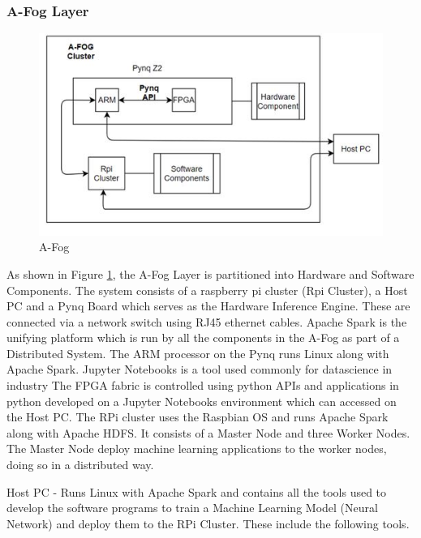 \subsubsection{A-Fog Layer}
    \begin{flushleft}
        \begin{figure}[H]
          
              \includegraphics[scale=0.8]{images/A-Fog.JPG}
              \caption{A-Fog}
              \label{fig:A-Fog}
        \end{figure}
        
        As shown in Figure \ref{fig:A-Fog}, the A-Fog Layer is partitioned into Hardware and Software Components. The system consists of a raspberry pi cluster (Rpi Cluster), a Host PC and a Pynq Board which serves as the Hardware Inference Engine. These are connected via a network switch using RJ45 ethernet cables. Apache Spark is the unifying platform which is run by all the components in the A-Fog as part of a Distributed System. The ARM processor on the Pynq runs Linux along with Apache Spark. Jupyter Notebooks is a tool used commonly for datascience in industry The FPGA fabric is controlled using python APIs and applications in python developed on a Jupyter Notebooks environment which can accessed on the Host PC. The RPi cluster uses the Raspbian OS and runs Apache Spark along with Apache HDFS. It consists of a Master Node and three Worker Nodes. The Master Node deploy machine learning applications to the worker nodes, doing so in a distributed way. 

        
        Host PC -  Runs Linux with Apache Spark and contains all the tools used to develop the software programs to train a Machine Learning Model (Neural Network) and deploy them to the RPi Cluster. These include the following tools.
         
        
    \end{flushleft}
    

